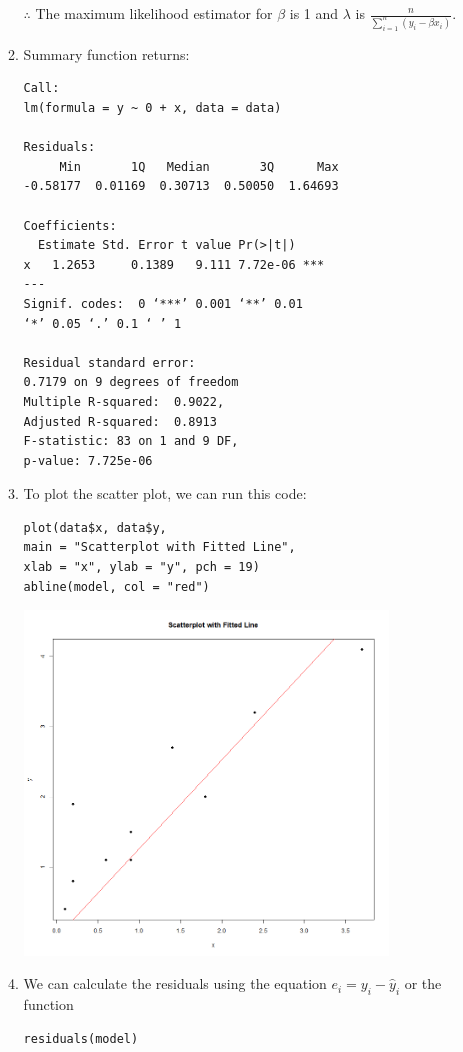 \documentclass[12pt]{article}
\begin{document}
\begin{enumerate}[1.]
\begin{enumerate}
                $\therefore$ The maximum likelihood estimator for $\beta$ is 1 and $\lambda$ is $\frac{n}{\sum_{i=1}^{n} (y_i - \beta x_i)}$.
                
            \item 
            
            Summary function returns:
            \begin{verbatim}
Call:
lm(formula = y ~ 0 + x, data = data)

Residuals:
     Min       1Q   Median       3Q      Max 
-0.58177  0.01169  0.30713  0.50050  1.64693 

Coefficients:
  Estimate Std. Error t value Pr(>|t|)    
x   1.2653     0.1389   9.111 7.72e-06 ***
---
Signif. codes:  0 ‘***’ 0.001 ‘**’ 0.01
‘*’ 0.05 ‘.’ 0.1 ‘ ’ 1

Residual standard error:
0.7179 on 9 degrees of freedom
Multiple R-squared:  0.9022,
Adjusted R-squared:  0.8913 
F-statistic: 83 on 1 and 9 DF, 
p-value: 7.725e-06
            \end{verbatim}
            \item To plot the scatter plot, we can run this code:
            \begin{verbatim}
plot(data$x, data$y, 
main = "Scatterplot with Fitted Line",
xlab = "x", ylab = "y", pch = 19)
abline(model, col = "red")
            \end{verbatim}
            
            \includegraphics[width=0.80\textwidth]{Rplot.png}

            \item We can calculate the residuals using the equation $e_i = y_i - \hat{y}_i $ or the function 
            \begin{verbatim}
residuals(model)
            \end{verbatim}


\end{enumerate}
\end{enumerate}
\end{document}
